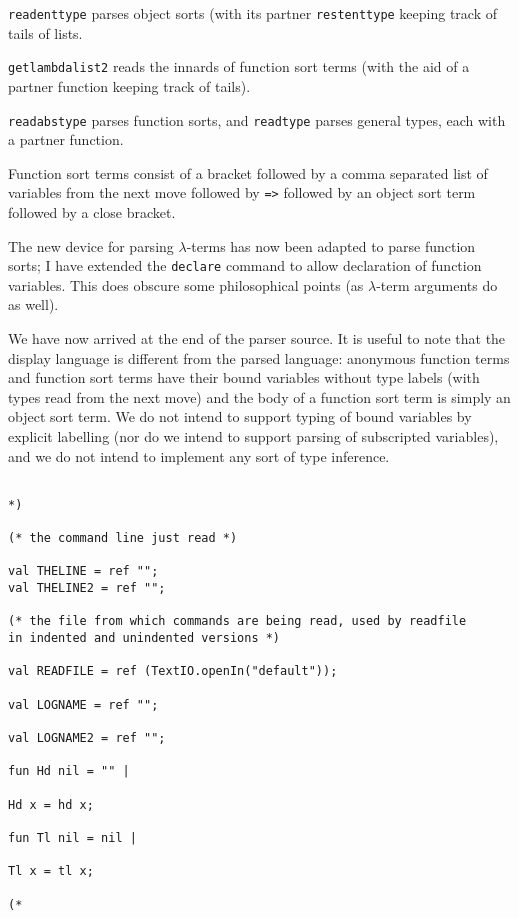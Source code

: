 \documentclass{article}
\begin{document}
{\tt readenttype} parses object sorts (with its partner {\tt restenttype} keeping track of tails of lists.

{\tt getlambdalist2} reads the innards of function sort terms (with the aid of a partner function keeping track of tails).

{\tt readabstype} parses function sorts, and {\tt readtype} parses general types, each with a partner function.

Function sort terms consist of a bracket followed by a comma separated list of variables from the next move followed by {\tt =>} followed
by an object sort term followed by a close bracket.

The new device for parsing $\lambda$-terms has now been adapted to parse function sorts;  I have extended the
{\tt declare} command to allow declaration of function variables.  This does obscure some philosophical points (as $\lambda$-term arguments do as well).

We have now arrived at the end of the parser source.    It is useful to note that the display language is different from the parsed language:  anonymous function terms
and function sort terms have their bound variables without type labels (with types read from the next move) and the body of a function sort term is simply an
object sort term.  We do not intend to support typing of bound variables by explicit labelling (nor do we intend to support parsing of subscripted variables),
and we do not intend to implement any sort of type inference.

\begin{verbatim}

*)

(* the command line just read *)

val THELINE = ref "";
val THELINE2 = ref "";

(* the file from which commands are being read, used by readfile
in indented and unindented versions *)

val READFILE = ref (TextIO.openIn("default"));

val LOGNAME = ref "";

val LOGNAME2 = ref "";

fun Hd nil = "" |

Hd x = hd x;

fun Tl nil = nil |

Tl x = tl x; 

(*

\end{verbatim}
\end{document}
